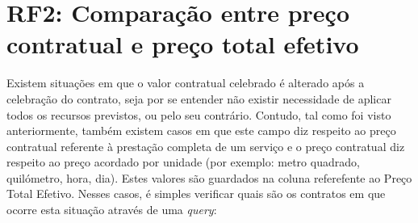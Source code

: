 \section{RF2: Comparação entre preço contratual e preço total efetivo}

Existem situações em que o valor contratual celebrado é alterado após a celebração do contrato, seja por se entender não existir necessidade de aplicar todos os recursos previstos, ou pelo seu contrário. Contudo, tal como foi visto anteriormente, também existem casos em que este campo diz respeito ao preço contratual referente à prestação completa de um serviço e o preço contratual diz respeito ao preço acordado por unidade (por exemplo: metro quadrado, quilómetro, hora, dia). Estes valores são guardados na coluna referefente ao Preço Total Efetivo. Nesses casos, é simples verificar quais são os contratos em que ocorre esta situação através de uma \textit{query}: 


%
%

